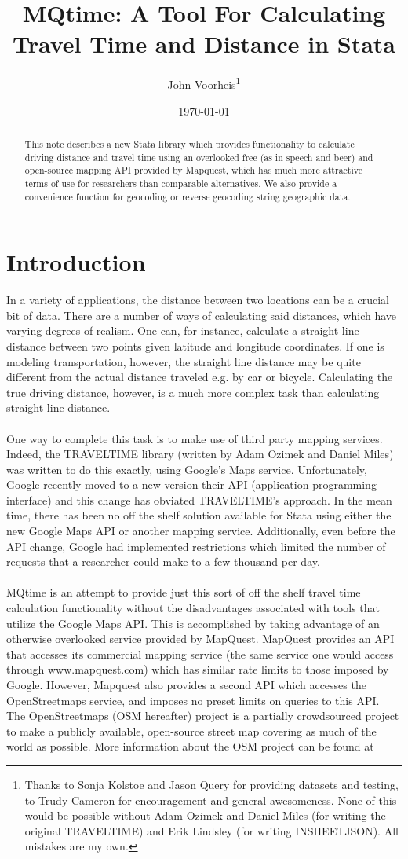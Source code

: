 \documentclass[12pt]{article}
\title{MQtime: A Tool For Calculating Travel Time and Distance in Stata}
\author{John Voorheis\thanks{Thanks to Sonja Kolstoe and Jason Query for providing datasets and testing, to Trudy Cameron for encouragement and general awesomeness. None of this would be possible without Adam Ozimek and Daniel Miles (for writing the original TRAVELTIME) and Erik Lindsley (for writing INSHEETJSON). All mistakes are my own.}}
\affil{University of Oregon}
\date{\today}
\begin{document}
\maketitle

\begin{abstract}
This note describes a new Stata library which provides functionality to calculate driving distance and travel time using an overlooked free (as in speech and beer)  and open-source mapping API provided by Mapquest, which has much more attractive terms of use for researchers than comparable alternatives. We also provide a convenience function for geocoding or reverse geocoding string geographic data. 
\end{abstract}

\section{Introduction}
In a variety of applications, the distance between two locations can be a crucial bit of data. There are a number of ways of calculating said distances, which have varying degrees of realism. One can, for instance, calculate a straight line distance between two points given latitude and longitude coordinates. If one is modeling transportation, however, the straight line distance may be quite different from the actual distance traveled e.g. by car or bicycle. Calculating the true driving distance, however, is a much more complex task than calculating straight line distance. 
\\ \\
One way to complete this task is to make use of third party mapping services. Indeed, the TRAVELTIME library (written by Adam Ozimek and Daniel Miles) was written to do this exactly, using Google's Maps service. Unfortunately, Google recently moved to a new version their API (application programming interface) and this change has obviated TRAVELTIME's approach. In the mean time, there has been no off the shelf solution available for Stata using either the new Google Maps API or another mapping service. Additionally, even before the API change, Google had implemented restrictions which limited the number of requests that a researcher could make to a few thousand per day.
\\ \\
MQtime is an attempt to provide just this sort of off the shelf travel time calculation functionality without the disadvantages associated with tools that utilize the Google Maps API. This is accomplished by taking advantage of an otherwise overlooked service provided by MapQuest. MapQuest provides an API that accesses its commercial mapping service (the same service one would access through www.mapquest.com) which has similar rate limits to those imposed by Google. However, Mapquest also provides a second API which accesses the OpenStreetmaps service, and imposes no preset limits on queries to this API. The OpenStreetmaps (OSM hereafter) project is a partially crowdsourced project to make a publicly available, open-source street map covering as much of the world as possible. More information about the OSM project can be found at 
\end{document}
